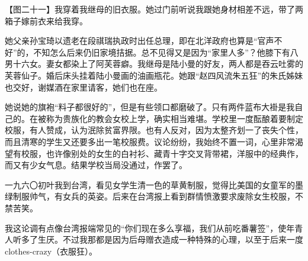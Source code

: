 \par 【图二十一】我穿着我继母的旧衣服。她过门前听说我跟她身材相差不远，带了两箱子嫁前衣来给我穿。
\par 她父亲孙宝琦以遗老在段祺瑞执政时出任总理，即在北洋政府也算是“官声不好”的，不知怎么后来仍旧家境拮据。总不见得又是因为“家里人多”？他膝下有八男十六女。妻女都染上了阿芙蓉癖。我继母是陆小曼的好友，两人都是吞云吐雾的芙蓉仙子。婚后床头挂着陆小曼画的油画瓶花。她跟“赵四风流朱五狂”的朱氏姊妹也交好，谢媒酒在家里请客，她们也在座。
\par 她说她的旗袍“料子都很好的”，但是有些领口都磨破了。只有两件蓝布大褂是我自己的。在被称为贵族化的教会女校上学，确实相当难堪。学校里一度酝酿着要制定校服，有人赞成，认为泯除贫富界限。也有人反对，因为太整齐划一了丧失个性，而且清寒的学生又还要多出一笔校服费。议论纷纷，我始终不置一词，心里非常渴望有校服，也许像别处的女生的白衬衫、藏青十字交叉背带裙，洋服中的经典作，而又有少女气息。结果学校当局没通过，作罢了。
\par 一九六〇初叶我到台湾，看见女学生清一色的草黄制服，觉得比美国的女童军的墨绿制服帅气，有女兵的英姿。后来在台湾报上看到群情愤激要求废除女生校服，不禁苦笑。
\par 我这论调有点像台湾报端常见的“你们现在多么享福，我们从前吃番薯签”，使年青人听多了生厌。不过我那都是因为后母赠衣造成一种特殊的心理，以至于后来一度clothes-crazy（衣服狂）。
